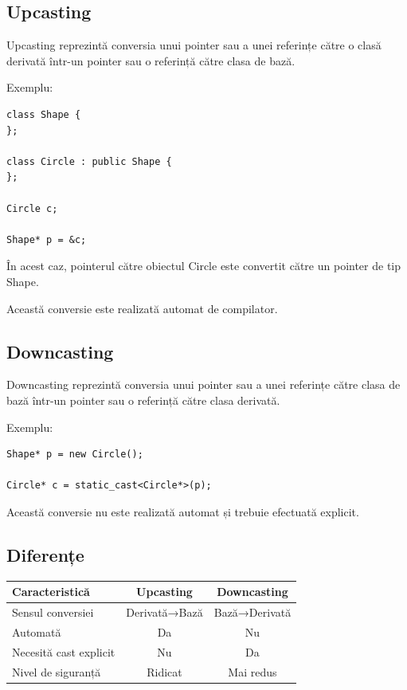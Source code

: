 \documentclass[12pt,a4paper]{article}
\begin{document}
\subsection{Upcasting}

Upcasting reprezintă conversia unui pointer sau a unei referințe către o clasă derivată într-un pointer sau o referință către clasa de bază.

Exemplu:

\begin{verbatim}
class Shape {
};

class Circle : public Shape {
};

Circle c;

Shape* p = &c;
\end{verbatim}

În acest caz, pointerul către obiectul Circle este convertit către un pointer de tip Shape.

Această conversie este realizată automat de compilator.

\subsection{Downcasting}

Downcasting reprezintă conversia unui pointer sau a unei referințe către clasa de bază într-un pointer sau o referință către clasa derivată.

Exemplu:

\begin{verbatim}
Shape* p = new Circle();

Circle* c = static_cast<Circle*>(p);
\end{verbatim}

Această conversie nu este realizată automat și trebuie efectuată explicit.

\subsection{Diferențe}

\begin{center}
\begin{tabular}{|l|c|c|}
\hline
Caracteristică & Upcasting & Downcasting \\
\hline
Sensul conversiei & Derivată→Bază & Bază→Derivată \\
\hline
Automată & Da & Nu \\
\hline
Necesită cast explicit & Nu & Da \\
\hline
Nivel de siguranță & Ridicat & Mai redus \\
\hline
\end{tabular}
\end{center}
\end{document}
